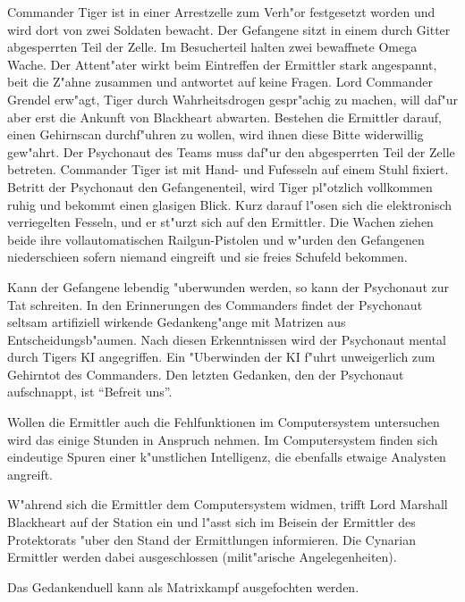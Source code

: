 Commander Tiger ist in einer Arrestzelle zum Verh"or festgesetzt worden und wird dort von zwei Soldaten bewacht. Der Gefangene sitzt in einem durch Gitter abgesperrten Teil der Zelle. Im Besucherteil halten zwei bewaffnete Omega Wache. Der Attent"ater wirkt beim Eintreffen der Ermittler stark angespannt, bei\3t die Z"ahne zusammen und antwortet auf keine Fragen. Lord Commander Grendel erw"agt, Tiger durch Wahrheitsdrogen gespr"achig zu machen, will daf"ur aber erst die Ankunft von Blackheart abwarten. Bestehen die Ermittler darauf, einen Gehirnscan durchf"uhren zu wollen, wird ihnen diese Bitte widerwillig gew"ahrt. Der Psychonaut des Teams muss daf"ur den abgesperrten Teil der Zelle betreten. Commander Tiger ist mit Hand- und Fu\3fesseln auf einem Stuhl fixiert. Betritt der Psychonaut den Gefangenenteil, wird Tiger pl"otzlich vollkommen ruhig und bekommt einen glasigen Blick. Kurz darauf l"osen sich die elektronisch verriegelten Fesseln, und er st"urzt sich auf den Ermittler. Die Wachen ziehen beide ihre vollautomatischen Railgun-Pistolen und w"urden den Gefangenen niederschie\3en sofern niemand eingreift und sie freies Schu\3feld bekommen.

Kann der Gefangene lebendig "uberwunden werden, so kann der Psychonaut zur Tat schreiten. In den Erinnerungen des Commanders findet der Psychonaut seltsam artifiziell wirkende Gedankeng"ange mit Matrizen aus Entscheidungsb"aumen. Nach diesen Erkenntnissen wird der Psychonaut mental durch Tigers KI angegriffen. Ein "Uberwinden der KI f"uhrt unweigerlich zum Gehirntot des Commanders. Den letzten Gedanken, den der Psychonaut aufschnappt, ist "`Befreit uns"'.

Wollen die Ermittler auch die Fehlfunktionen im Computersystem untersuchen wird das einige Stunden in Anspruch nehmen. Im Computersystem finden sich eindeutige Spuren einer k"unstlichen Intelligenz, die ebenfalls etwaige Analysten angreift.

W"ahrend sich die Ermittler dem Computersystem widmen, trifft Lord Marshall Blackheart auf der Station ein und l"asst sich im Beisein der Ermittler des Protektorats "uber den Stand der Ermittlungen informieren. Die Cynarian Ermittler werden dabei ausgeschlossen (milit"arische Angelegenheiten).

\begin{remarks}
	Das Gedankenduell kann als Matrixkampf ausgefochten werden.
\end{remarks}


